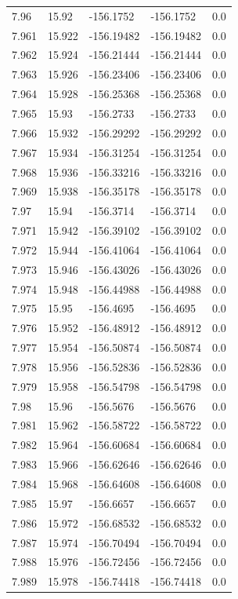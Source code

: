 \begin{tabular}{lllll}
7.96 & 15.92 & -156.1752 & -156.1752 & 0.0 \\
7.961 & 15.922 & -156.19482 & -156.19482 & 0.0 \\
7.962 & 15.924 & -156.21444 & -156.21444 & 0.0 \\
7.963 & 15.926 & -156.23406 & -156.23406 & 0.0 \\
7.964 & 15.928 & -156.25368 & -156.25368 & 0.0 \\
7.965 & 15.93 & -156.2733 & -156.2733 & 0.0 \\
7.966 & 15.932 & -156.29292 & -156.29292 & 0.0 \\
7.967 & 15.934 & -156.31254 & -156.31254 & 0.0 \\
7.968 & 15.936 & -156.33216 & -156.33216 & 0.0 \\
7.969 & 15.938 & -156.35178 & -156.35178 & 0.0 \\
7.97 & 15.94 & -156.3714 & -156.3714 & 0.0 \\
7.971 & 15.942 & -156.39102 & -156.39102 & 0.0 \\
7.972 & 15.944 & -156.41064 & -156.41064 & 0.0 \\
7.973 & 15.946 & -156.43026 & -156.43026 & 0.0 \\
7.974 & 15.948 & -156.44988 & -156.44988 & 0.0 \\
7.975 & 15.95 & -156.4695 & -156.4695 & 0.0 \\
7.976 & 15.952 & -156.48912 & -156.48912 & 0.0 \\
7.977 & 15.954 & -156.50874 & -156.50874 & 0.0 \\
7.978 & 15.956 & -156.52836 & -156.52836 & 0.0 \\
7.979 & 15.958 & -156.54798 & -156.54798 & 0.0 \\
7.98 & 15.96 & -156.5676 & -156.5676 & 0.0 \\
7.981 & 15.962 & -156.58722 & -156.58722 & 0.0 \\
7.982 & 15.964 & -156.60684 & -156.60684 & 0.0 \\
7.983 & 15.966 & -156.62646 & -156.62646 & 0.0 \\
7.984 & 15.968 & -156.64608 & -156.64608 & 0.0 \\
7.985 & 15.97 & -156.6657 & -156.6657 & 0.0 \\
7.986 & 15.972 & -156.68532 & -156.68532 & 0.0 \\
7.987 & 15.974 & -156.70494 & -156.70494 & 0.0 \\
7.988 & 15.976 & -156.72456 & -156.72456 & 0.0 \\
7.989 & 15.978 & -156.74418 & -156.74418 & 0.0 \\

\end{tabular}
